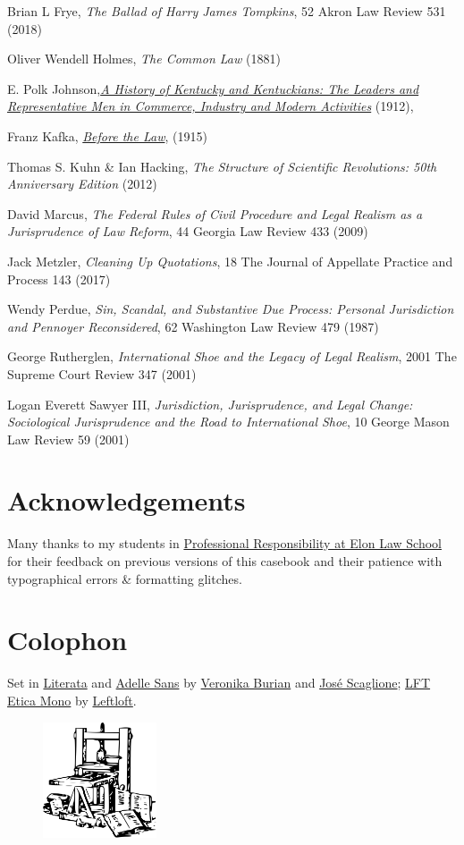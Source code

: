 Brian L Frye, \textit{The Ballad of Harry James Tompkins}, 52 Akron Law Review 531 (2018)

Oliver Wendell Holmes, \textit{The Common Law} (1881)

E. Polk Johnson,\href{https://play.google.com/books/reader?id=FXQUAAAAYAAJ\&pg=GBS.PA1144.w.2.1.0_421}{\textit{A History of Kentucky and Kentuckians: The Leaders and Representative Men in Commerce, Industry and Modern Activities}} (1912), 

Franz Kafka, \href{https://www.kafka-online.info/before-the-law.html}{\textit{Before the Law}}, (1915) 

Thomas S. Kuhn \& Ian Hacking, \textit{The Structure of Scientific Revolutions: 50th Anniversary Edition} (2012)

David Marcus, \textit{The Federal Rules of Civil Procedure and Legal Realism as a Jurisprudence of Law Reform}, 44 Georgia Law Review 433 (2009)

Jack Metzler, \textit{Cleaning Up Quotations}, 18 The Journal of Appellate Practice and Process 143 (2017)

Wendy Perdue, \textit{Sin, Scandal, and Substantive Due Process: Personal Jurisdiction and Pennoyer Reconsidered}, 62 Washington Law Review 479 (1987)

George Rutherglen, \textit{International Shoe and the Legacy of Legal Realism}, 2001 The Supreme Court Review 347 (2001)

Logan Everett Sawyer III, \textit{Jurisdiction, Jurisprudence, and Legal Change: Sociological Jurisprudence and the Road to International Shoe}, 10 George Mason Law Review 59 (2001)

\chapter*{Acknowledgements}

Many thanks to my students in \href{https://www.emfink.net/PR/}{Professional Responsibility at Elon Law School} for their feedback on previous versions of this casebook and their patience with typographical errors \& formatting glitches. 

\chapter*{Colophon}

\raggedright{Set in \href{https://www.type-together.com/literata-font/}{Literata} and \href{https://www.type-together.com/adelle-sans-font/}{Adelle Sans} by \href{https://www.type-together.com/veronika-burian/}{Veronika Burian} and \href{https://www.type-together.com/jose-scaglione/}{José Scaglione}; \href{https://www.type-together.com/lft-etica-mono-font/}{LFT Etica Mono} by \href{https://www.type-together.com/leftloft/}{Leftloft}.}

\begin{figure}
\centering
\includegraphics[width=0.3\textwidth]{../img/gutenberg_press.png}
\end{figure}